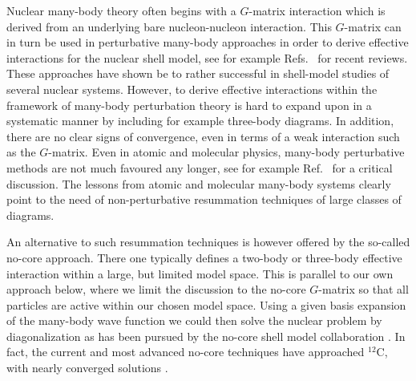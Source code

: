 \documentclass{ws-procs9x6}
\begin{document}
Nuclear many-body theory
often begins with a $G$-matrix interaction which is derived from 
an underlying bare nucleon-nucleon interaction.  
This $G$-matrix can in turn be used in perturbative many-body approaches
in order to derive effective interactions for the nuclear shell model, 
see for example Refs.~\cite{mhj95,dehko04} for recent reviews.
These approaches have shown be to rather successful in shell-model studies of 
several nuclear systems. However, to derive effective interactions within 
the framework of many-body perturbation theory 
is hard to expand upon in a systematic manner by including for example 
three-body diagrams.
In addition, there are
no clear signs of convergence, even  in terms of a weak interaction such as the $G$-matrix. Even in atomic and molecular physics, many-body perturbative
methods are not much favoured any longer, see for example Ref.~\cite{helgaker} for a 
critical discussion. 
The lessons from atomic and molecular many-body systems clearly point to 
the need of non-perturbative resummation techniques of large
classes of diagrams.  

An alternative to such resummation techniques is however offered by the 
so-called no-core approach. There one typically defines a two-body or three-body effective interaction within a large, but limited model space. This is 
parallel to our own approach below, where we limit
the discussion to the no-core $G$-matrix so that all particles are active
within our chosen model space.  Using a given basis expansion
of the many-body wave function we could then solve the nuclear problem by
diagonalization as has been pursued by the no-core shell model collaboration
\cite{bruce1,bruce2,bruce3,petr_erich2002}. 
In fact, the current and most advanced no-core
techniques have approached $^{12}$C, with nearly
converged solutions \cite{hayes03}.
\end{document}
